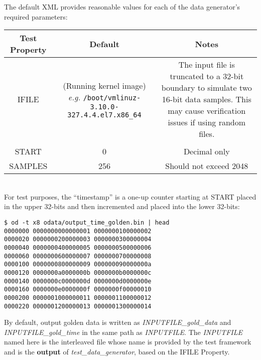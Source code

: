 \documentclass{article}
\begin{document}
The default XML provides reasonable values for each of the data generator's required parameters:\\
	\begin{tabularx}{\textwidth}{|c|C|C|}
		\hline
		Test Property & Default & Notes \\
		\hline
		IFILE & (Running kernel image) \textit{e.g.} \verb+/boot/vmlinuz-3.10.0-327.4.4.el7.x86_64+ & The input file is truncated to a 32-bit boundary to simulate two 16-bit data samples. This may cause verification issues if using random files.\\
		&  & \\
		\hline
		START & 0 & Decimal only \\
		\hline
		SAMPLES & 256 & Should not exceed 2048 \\
		\hline
	\end{tabularx}\\

\medskip
For test purposes, the ``timestamp'' is a one-up counter starting at START placed in the upper 32-bits and then incremented and placed into the lower 32-bits:

\begin{lstlisting}
$ od -t x8 odata/output_time_golden.bin | head
0000000 0000000000000001 0000000100000002
0000020 0000000200000003 0000000300000004
0000040 0000000400000005 0000000500000006
0000060 0000000600000007 0000000700000008
0000100 0000000800000009 000000090000000a
0000120 0000000a0000000b 0000000b0000000c
0000140 0000000c0000000d 0000000d0000000e
0000160 0000000e0000000f 0000000f00000010
0000200 0000001000000011 0000001100000012
0000220 0000001200000013 0000001300000014
\end{lstlisting}
\medskip

By default, output golden data is written as \textit{INPUTFILE\_gold\_data} and \textit{INPUTFILE\_gold\_time} in the same path as \textit{INPUTFILE}. The \textit{INPUTFILE} named here is the interleaved file whose name is provided by the test framework and is the \textbf{output} of \textit{test\_data\_generator}, based on the IFILE Property.
\end{document}
